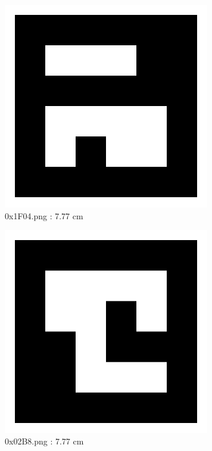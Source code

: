 \documentclass[11pt,a4,BCOR=0cm]{scrartcl}
\begin{document}
\begin{figure}
  \centering
    \includegraphics[natwidth=400,natheight=400,width=9cm]{0x1F04.png}
    \caption{0x1F04.png : 7.77 cm}
    \label{fig:0x1F04.png}
  
\end{figure} 

\begin{figure}
  \centering
    \includegraphics[natwidth=400,natheight=400,width=9cm]{0x02B8.png}
    \caption{0x02B8.png : 7.77 cm}
    \label{fig:0x02B8.png}
  
\end{figure} 

\clearpage
\end{document}
